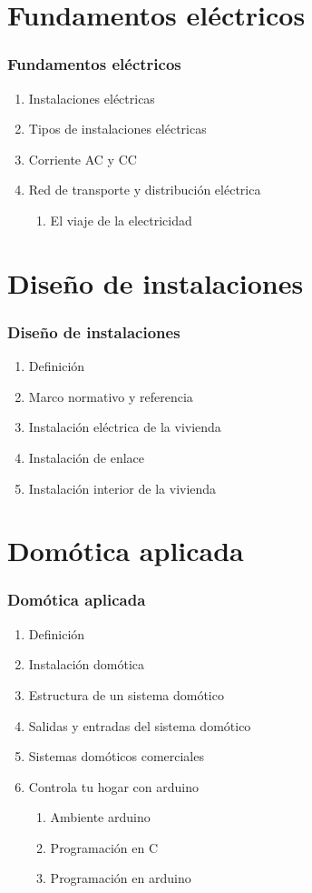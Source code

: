 \documentclass[xcolor=dvipsnames,envcountsect]{beamer}
\begin{document}
\section{Fundamentos eléctricos}
\begin{frame}
	\frametitle{Fundamentos eléctricos}
		\justifying
		\begin{enumerate}
			\item Instalaciones eléctricas
			\item Tipos de instalaciones eléctricas
			\item Corriente AC y CC
			\item Red de transporte y distribución eléctrica
			\begin{enumerate}
			\item El viaje de la electricidad
			\end{enumerate}
		\end{enumerate}
\end{frame}


\section{Diseño de instalaciones}
\begin{frame}
	\frametitle{Diseño de instalaciones}
		\justifying
		\begin{enumerate}
			\item Definición
			\item Marco normativo y referencia
			\item Instalación eléctrica de la vivienda
			\item Instalación de enlace
			\item Instalación interior de la vivienda
		\end{enumerate}
\end{frame}



\section{Domótica aplicada}

\begin{frame}
		\frametitle{Domótica aplicada}
		\begin{enumerate}
			\item Definición
			\item Instalación domótica
			\item Estructura de un sistema domótico
			\item Salidas y entradas del sistema domótico
			\item Sistemas domóticos comerciales
			\item Controla tu hogar con arduino
			\begin{enumerate}
				\item Ambiente arduino
				\item Programación en C
				\item Programación en arduino 
			\end{enumerate}			
		\end{enumerate}				
\end{frame}
\end{document}
